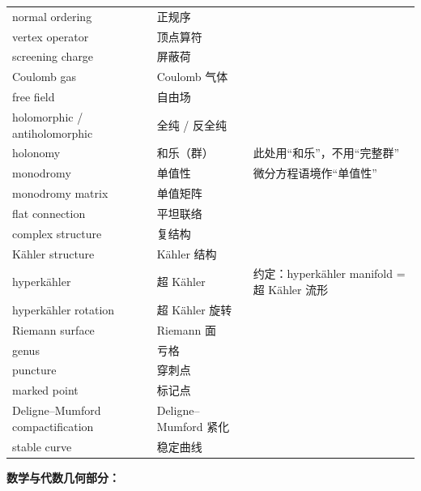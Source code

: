 \begin{longtable}{@{}p{}p{}p{}@{}}
normal ordering             & 正规序              & \\
vertex operator             & 顶点算符            & \\
screening charge            & 屏蔽荷              & \\
Coulomb gas                 & Coulomb 气体        & \\
free field                  & 自由场              & \\
holomorphic / antiholomorphic & 全纯 / 反全纯     & \\
holonomy                    & 和乐（群）          & 此处用“和乐”，不用“完整群” \\
monodromy                   & 单值性              & 微分方程语境作“单值性” \\
monodromy matrix            & 单值矩阵            & \\
flat connection             & 平坦联络            & \\
complex structure           & 复结构              & \\
K\"ahler structure          & K\"ahler 结构       & \\
hyperk\"ahler               & 超 K\"ahler         & 约定：hyperk\"ahler manifold = 超 K\"ahler 流形 \\
hyperk\"ahler rotation      & 超 K\"ahler 旋转    & \\
Riemann surface             & Riemann 面          & \\
genus                       & 亏格                & \\
puncture                    & 穿刺点              & \\
marked point                & 标记点              & \\
Deligne--Mumford compactification & Deligne--Mumford 紧化 & \\
stable curve                & 稳定曲线            & \\
\end{longtable}

\medskip
\noindent
\textbf{数学与代数几何部分：}

